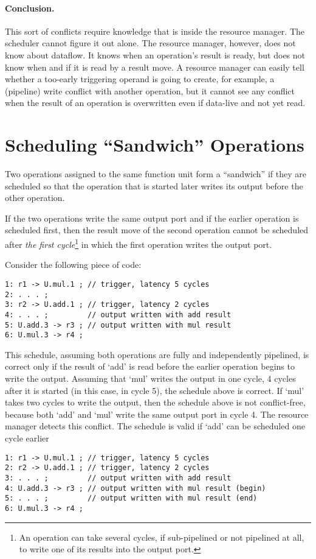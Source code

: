 \documentclass[a4paper,twoside]{tce}
\begin{document}
\paragraph{Conclusion.} This sort of conflicts require knowledge that is
inside the resource manager. The scheduler cannot figure it out alone.
%
The resource manager, however, does not know about dataflow. It knows when
an operation's result is ready, but does not know when and if it is read by
a result move. A resource manager can easily tell whether a too-early
triggering operand is going to create, for example, a (pipeline) write
conflict with another operation, but it cannot see any conflict when the
result of an operation is overwritten even if data-live and not yet read.

\section{Scheduling ``Sandwich'' Operations}
\label{ch:pending:sandwich}

Two operations assigned to the same function unit form a ``sandwich'' if
they are scheduled so that the operation that is started later writes its
output before the other operation.

If the two operations write the same output port and if the earlier
operation is scheduled first, then the result move of the second operation
cannot be scheduled after \emph{the first cycle}\footnote{
%
  An operation can take several cycles, if sub-pipelined or not pipelined at
  all, to write one of its results into the output port.}
%
in which the first operation writes the output port.

Consider the following piece of code:
\begin{verbatim}
1: r1 -> U.mul.1 ; // trigger, latency 5 cycles
2: . . . ;
3: r2 -> U.add.1 ; // trigger, latency 2 cycles
4: . . . ;         // output written with add result
5: U.add.3 -> r3 ; // output written with mul result
6: U.mul.3 -> r4 ;
\end{verbatim}
This schedule, assuming both operations are fully and independently
pipelined, is correct only if the result of `add' is read before the earlier
operation begins to write the output. Assuming that `mul' writes the output
in one cycle, 4 cycles after it is started (in this case, in cycle 5), the
schedule above is correct.
%
If `mul' takes two cycles to write the output, then the schedule above is
not conflict-free, because both `add' and `mul' write the same output port
in cycle 4. The resource manager detects this conflict.
%
The schedule is valid if `add' can be scheduled one cycle earlier
\begin{verbatim}
1: r1 -> U.mul.1 ; // trigger, latency 5 cycles
2: r2 -> U.add.1 ; // trigger, latency 2 cycles
3: . . . ;         // output written with add result
4: U.add.3 -> r3 ; // output written with mul result (begin)
5: . . . ;         // output written with mul result (end)
6: U.mul.3 -> r4 ;
\end{verbatim}
\end{document}
